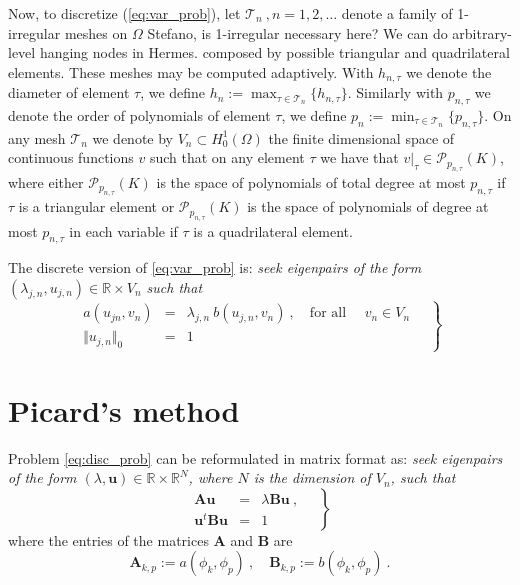 \documentclass[preprint ,12pt]{elsarticle}
\newcommand{\cT}{\mathcal{T}}
\begin{document}
Now, to discretize (\ref{eq:var_prob}), let $\cT_n\ , n =
1,2,\ldots $ denote a family of 1-irregular meshes on $\Omega$ 
{\red Stefano, is 1-irregular necessary here? We can do arbitrary-level
hanging nodes in Hermes.}
composed by possible triangular and quadrilateral elements. 
These meshes may be computed adaptively. 
With  $h_{n,\tau}$ we denote  the diameter of element $\tau$,  
we define
$
h_n:=\max_{\tau\in \mathcal{T}_n}\{h_{n,\tau}\}.
$
Similarly with  $p_{n,\tau}$ we denote  the order of polynomials of element $\tau$,  
we define
$
p_n:=\min_{\tau\in \mathcal{T}_n}\{p_{n,\tau}\}.
$
On any mesh $\mathcal{T}_n$ we denote by $V_n \subset H^1_0(\Omega)$ the finite
dimensional space of continuous functions $v$ such that on any element $\tau$ we have that 
$v|_\tau\in \mathcal{P}_{p_{n,\tau}}(K)$, where either $\mathcal{P}_{p_{n,\tau}}(K)$ is the space of polynomials of total degree at most $p_{n,\tau}$ if $\tau$ is a triangular element or $\mathcal{P}_{p_{n,\tau}}(K)$ is the space of polynomials of degree at most $p_{n,\tau}$ in each variable if $\tau$ is a quadrilateral element.



The discrete version of \eqref{eq:var_prob} is:
\emph{seek eigenpairs of the form $(\lambda_{j,n},u_{j,n})\in
\mathbb{R}\times V_n$
such that}
\begin{equation}
\label{eq:disc_prob}
\left.
\begin{array}{lcl}
a(u_{jn},v_{n})&=& \lambda_{j,n}\ b(u_{j,n},v_{n})\ ,
\quad \text{for all } \quad v_{n}  \in V_n\\
 \Vert u_{j,n} \Vert_{0} &=& 1
\end{array}\quad
\right\}
\end{equation}


\section{Picard's method}

Problem \eqref{eq:disc_prob} can be reformulated in matrix format as:
\emph{seek eigenpairs of the form $(\lambda,\mathbf{u})\in
\mathbb{R}\times \mathbb{R}^N$, where $N$ is the dimension of $V_n$,
such that}
\begin{equation}
\label{eq:disc_prob_mat}
\left.
\begin{array}{lcl}
\mathbf{A} \mathbf{u}&=& \lambda\mathbf{B}\mathbf{u}\ ,
\\
\mathbf{u}^t\mathbf{B} \mathbf{u} &=& 1
\end{array}\quad
\right\}
\end{equation}
where the entries of the matrices $\mathbf{A}$ and $\mathbf{B}$ are 
$$
\mathbf{A}_{k,p}:=a(\phi_k,\phi_p)\ ,\quad\mathbf{B}_{k,p}:=b(\phi_k,\phi_p)\ .
$$
\end{document}
